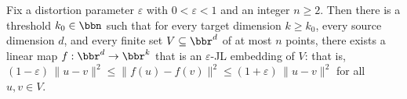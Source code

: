 \begin{theorem}
\label{johnson_lindenstrauss_subgaussian_dim_bound}
\leanok
{}
Fix a distortion parameter $\varepsilon$ with $0 < \varepsilon < 1$ and an integer $n
\ge 2$. Then there is a threshold $k_0 \in \bbn$ such that for every target dimension $k
\ge k_0$, every source dimension $d$, and every finite set $V \subseteq \bbr^d$ of at
most $n$ points, there exists a linear map $f : \bbr^d \to \bbr^k$ that is an
$\varepsilon$-JL embedding of $V$: that is, $(1-\varepsilon)\,\|u - v\|^2 \le \|f(u) -
f(v)\|^2 \le (1+\varepsilon)\,\|u - v\|^2$ for all $u, v \in V$.
\end{theorem}
